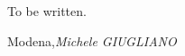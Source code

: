 %
%

\preface

To be written.

\vspace{\baselineskip}
\begin{flushright}\noindent
Modena,\hfill {\it Michele GIUGLIANO}\\
\end{flushright}


